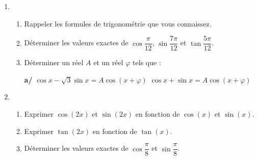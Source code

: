 
\begin{exercice}\label{exoautoanalyseCTU-4}


\begin{enumerate}
\item \begin{enumerate}
\item Rappeler les formules de trigonométrie que vous connaissez.
\item Déterminer les valeurs exactes de $\cos \dfrac{\pi}{12}$, $\sin \dfrac{7\pi}{12}$ et $\tan \dfrac{5\pi}{12}$.
\item Déterminer un réel $A$ et un réel $\varphi$ tels que : 

{\bfseries a/} $\cos x - \sqrt{3} \sin x = A \cos(x+\varphi)$  $\cos x + \sin x = A \cos(x+\varphi)$
\end{enumerate}
\item \begin{enumerate}
\item Exprimer $\cos (2x)$ et $\sin (2x)$ en fonction de $\cos (x)$ et $\sin (x)$. 
\item Exprimer $\tan (2x)$ en fonction de $\tan (x)$.
\item Déterminer les valeurs exactes de $\cos \dfrac{\pi}{8}$ et $\sin \dfrac{\pi}{8}$. 
\end{enumerate}
\end{enumerate}




\end{exercice}
